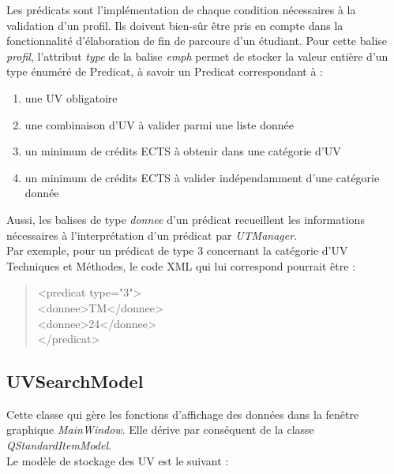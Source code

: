 \documentclass[a4paper,10pt,french]{report}
\begin{document}
	Les prédicats sont l'implémentation de chaque condition nécessaires à la validation d'un profil.
	Ils doivent bien-sûr être pris en compte dans la fonctionnalité d'élaboration de fin de parcours d'un étudiant.	
	Pour cette balise \emph{profil}, l'attribut \emph{type} de la balise \emph{emph} permet de stocker la valeur entière d'un type énuméré de Predicat, à savoir un Predicat correspondant à :\\
	\begin{enumerate}
	\item une UV obligatoire
	\item une combinaison d'UV à valider parmi une liste donnée
	\item un minimum de crédits ECTS à obtenir dans une catégorie d'UV
	\item un minimum de crédits ECTS à valider indépendamment d'une catégorie donnée
	\end{enumerate}
	Aussi, les balises de type \emph{donnee} d'un prédicat recueillent les informations nécessaires à l'interprétation d'un prédicat par \emph{UTManager}.\\
	Par exemple, pour un prédicat de type 3 concernant la catégorie d'UV Techniques et Méthodes, le code XML qui lui correspond pourrait être :
	\begin{quote}
<predicat type="3">\\
		\hspace*{1cm}<donnee>TM</donnee>\\
		\hspace*{1cm}<donnee>24</donnee>\\
</predicat>\\
	\end{quote}
	
	
	
	\subsection{UVSearchModel}\label{subsec:UVSearchModel}
	
	Cette classe qui gère les fonctions d'affichage des données dans la fenêtre graphique \emph{MainWindow}.
    Elle dérive par conséquent de la classe \emph{QStandardItemModel}.\\
	Le modèle de stockage des UV est le suivant :\\
	
\end{document}
